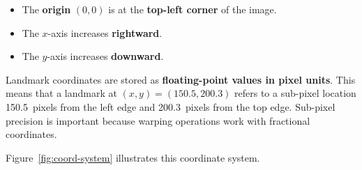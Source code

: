 \begin{itemize}
    \item The \textbf{origin} $(0, 0)$ is at the \textbf{top-left corner} of the image.
    \item The $x$-axis increases \textbf{rightward}.
    \item The $y$-axis increases \textbf{downward}.
\end{itemize}

Landmark coordinates are stored as \textbf{floating-point values in pixel units}. This means that a landmark at $(x, y) = (150.5, 200.3)$ refers to a sub-pixel location 150.5~pixels from the left edge and 200.3~pixels from the top edge. Sub-pixel precision is important because warping operations work with fractional coordinates.

Figure~\ref{fig:coord-system} illustrates this coordinate system.

